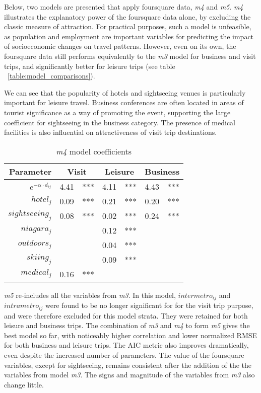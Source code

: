 Below, two models are presented that apply foursquare data, \textit{m4} and \textit{m5}. \textit{m4} illustrates the explanatory power of the foursquare data alone, by excluding the classic measure of attraction. For practical purposes, such a model is unfeasible, as population and employment are important variables for predicting the impact of socioeconomic changes on travel patterns. However, even on its own, the foursquare data still performs equivalently to the \textit{m3} model for business and visit trips, and significantly better for leisure trips (see table ~\ref{table:model_comparisons}).

We can see that the popularity of hotels and sightseeing venues is particularly important for leisure travel. Business conferences are often located in areas of tourist significance as a way of promoting the event, supporting the large coefficient for sightseeing in the business category. The presence of medical facilities is also influential on attractiveness of visit trip destinations. 


\begin{table}[H]
\centering
\caption{\textit{m4} model coefficients}
\label{table:m4-coeff}
\begin{tabular}{@{}rrlrlrl@{}}
  \toprule
 Parameter & \multicolumn{2}{c}{Visit} & \multicolumn{2}{c}{Leisure} & \multicolumn{2}{c}{Business} \\ \midrule
  $e^{-\alpha  \cdot d_{ij}}$  & 4.41 & *** & 4.11 & *** & 4.43 & *** \\ 
  $hotel_j$ & 0.09 & *** & 0.21 & *** & 0.20 & *** \\ 
  $sightseeing_j$ & 0.08 & *** & 0.02 & *** & 0.24 & *** \\ 
  $niagara_j$  &  &  & 0.12 & *** &  &  \\ 
  $outdoors_j$  &  &  & 0.04 & *** &  &  \\ 
  $skiing_j$   &  &  & 0.09 & *** &  &  \\ 
  $medical_j$  & 0.16 & *** &  &  &  &  \\ 
   \bottomrule
\end{tabular}
\end{table}

\textit{m5} re-includes all the variables from \textit{m3}. In this model, $intermetro_{ij}$ and $intrametro_{ij}$ were found to be no longer significant for for the visit trip purpose, and were therefore excluded for this model strata. They were retained for both leisure and business trips. The combination of \textit{m3} and \textit{m4} to form \textit{m5} gives the best model so far, with noticeably higher correlation and lower normalized RMSE for both business and leisure trips. The AIC metric also improves dramatically, even despite the increased number of parameters. The value of the foursquare variables, except for sightseeing, remains consistent after the addition of the the variables from model \textit{m3}. The signs and magnitude of the variables from \textit{m3} also change little.

